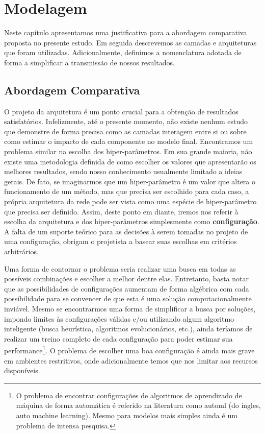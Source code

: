 \chapter{Modelagem}\label{cap:modelagem}

Neste capítulo apresentamos uma justificativa para a abordagem comparativa proposta no presente estudo. Em seguida descrevemos as camadas e arquiteturas que foram utilizadas. Adicionalmente, definimos a nomenclatura adotada de forma a simplificar a transmissão de nossos resultados.  

\section{Abordagem Comparativa}\label{sec:abordagem}

O projeto da arquitetura é um ponto crucial para a obtenção de resultados satisfatórios. Infelizmente, até o presente momento, não existe nenhum estudo que demonstre de forma precisa como as camadas interagem entre si ou sobre como estimar o impacto de cada componente no modelo final. Encontramos um problema similar na escolha dos hiper-parâmetros. Em sua grande maioria, não existe uma metodologia definida de como escolher os valores que apresentarão os melhores resultados, sendo nosso conhecimento usualmente limitado a ideias gerais. De fato, se imaginarmos que um hiper-parâmetro é um valor que altera o funcionamento de um método, mas que precisa ser escolhido para cada caso, a própria arquitetura da rede pode ser vista como uma espécie de hiper-parâmetro que precisa ser definido. Assim, deste ponto em diante, iremos nos referir à escolha da arquitetura e dos hiper-parâmetros simplesmente como \textbf{configuração}. A falta de um suporte teórico para as decisões à serem tomadas no projeto de uma configuração, obrigam o projetista a basear suas escolhas em critérios arbitrários.

Uma forma de contornar o problema seria realizar uma busca em todas as possíveis combinações e escolher a melhor dentre elas. Entretanto, basta notar que as possibilidades de configurações aumentam de forma algébrica com cada possibilidade para se convencer de que esta é uma solução computacionalmente inviável. Mesmo se encontrarmos uma forma de simplificar a busca por soluções, impondo limites às configurações válidas e/ou utilizando algum algoritmo inteligente (busca heurística, algoritmos evolucionários, etc.), ainda teríamos de realizar um treino completo de cada configuração para poder estimar sua performance\footnote{O problema de encontrar configurações de algoritmos de aprendizado de máquina de forma automática é referido na literatura como automl (do ingles, auto machine learning). Mesmo para modelos mais simples ainda é um problema de intensa pesquisa.}. O problema de escolher uma boa configuração é ainda mais grave em ambientes restritivos, onde adicionalmente temos que nos limitar aos recursos disponíveis. 

